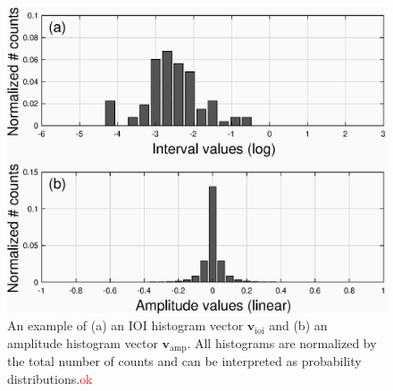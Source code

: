 \documentclass[conference]{IEEEtran}
\begin{document}
\begin{figure}
    \centering
    \includegraphics[width = 8 cm]{./figs/ioi_hist_examples.eps}
    \caption{An example of (a) an IOI histogram vector $\mathbf{v}_\mathrm{ioi}$ and (b) an amplitude histogram vector $\mathbf{v}_\mathrm{amp}$. All histograms are normalized by the total number of counts and can be interpreted as probability distributions.{\textcolor{red}{ok}}} 
    \label{fig:ioi_hist_example}
\end{figure}
\end{document}
